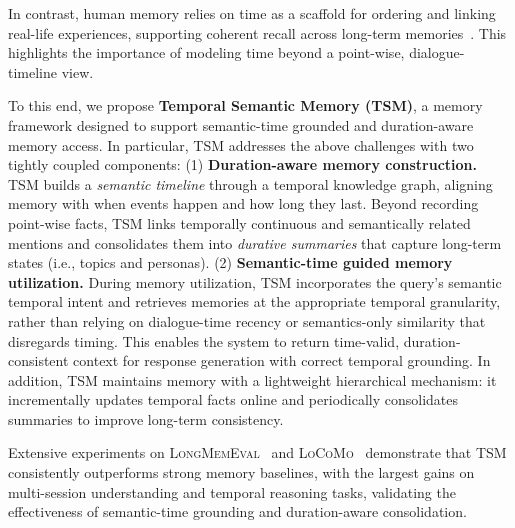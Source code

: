 \documentclass[11pt]{article}
\newcommand{\ours}[1]{TSM}
\begin{document}
In contrast, human memory relies on time as a scaffold for ordering and linking real-life experiences, supporting coherent recall across long-term memories~\cite{macdonald_hippocampal_2011,huet_episodic_2025}.
This highlights the importance of modeling time beyond a point-wise, dialogue-timeline view.


To this end, we propose \textbf{Temporal Semantic Memory (TSM)}, a memory framework designed to support semantic-time grounded and duration-aware memory access.
In particular, \ours{} addresses the above challenges with two tightly coupled components:
(1) \textbf{Duration-aware memory construction.} TSM builds a \emph{semantic timeline} through a temporal knowledge graph, aligning memory with when events happen and how long they last.
Beyond recording point-wise facts, \ours{} links temporally continuous and semantically related mentions and consolidates them into \emph{durative summaries} that capture long-term states (i.e., topics and personas).
(2) \textbf{Semantic-time guided memory utilization.} During memory utilization, \ours{} incorporates the query's semantic temporal intent and retrieves memories at the appropriate temporal granularity, rather than relying on dialogue-time recency or semantics-only similarity that disregards timing.
This enables the system to return time-valid, duration-consistent context for response generation with correct temporal grounding.
In addition, \ours{} maintains memory with a lightweight hierarchical mechanism: it incrementally updates temporal facts online and periodically consolidates summaries to improve long-term consistency.

Extensive experiments on \textsc{LongMemEval}~\cite{wu_longmemeval_2025} and \textsc{LoCoMo}~\cite{maharana_evaluating_2024} demonstrate that \ours{} consistently outperforms strong memory baselines, with the largest gains on multi-session understanding and temporal reasoning tasks, validating the effectiveness of semantic-time grounding and duration-aware consolidation.
\end{document}
